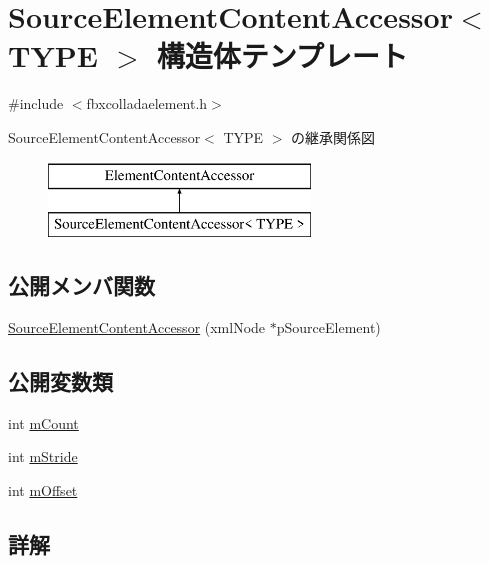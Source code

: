 \hypertarget{struct_source_element_content_accessor}{}\section{Source\+Element\+Content\+Accessor$<$ T\+Y\+PE $>$ 構造体テンプレート}
\label{struct_source_element_content_accessor}


{\ttfamily \#include $<$fbxcolladaelement.\+h$>$}

Source\+Element\+Content\+Accessor$<$ T\+Y\+PE $>$ の継承関係図\begin{figure}[H]
\begin{center}
\leavevmode
\includegraphics[height=2.000000cm]{struct_source_element_content_accessor}
\end{center}
\end{figure}
\subsection*{公開メンバ関数}
\begin{DoxyCompactItemize}
\item 
\hyperlink{struct_source_element_content_accessor_a6eb54cec39e924a3309beb5baefbde93}{Source\+Element\+Content\+Accessor} (xml\+Node $\ast$p\+Source\+Element)
\end{DoxyCompactItemize}
\subsection*{公開変数類}
\begin{DoxyCompactItemize}
\item 
int \hyperlink{struct_source_element_content_accessor_a21c1d4a1c15abe58b0fe1d4114c81f39}{m\+Count}
\item 
int \hyperlink{struct_source_element_content_accessor_af3895bda51b49a9086b11eaa7012ee2d}{m\+Stride}
\item 
int \hyperlink{struct_source_element_content_accessor_a1450ec3072e82c51aacd05fc21d15546}{m\+Offset}
\end{DoxyCompactItemize}


\subsection{詳解}
